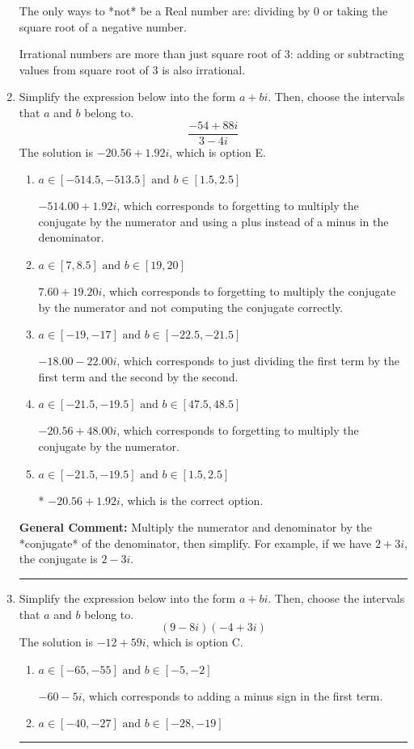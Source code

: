 \documentclass{extbook}[14pt]
\newcommand{\litem}[1]{\item #1

\rule{\textwidth}{0.4pt}}
\begin{document}
\begin{enumerate}
{ The only ways to *not* be a Real number are: dividing by 0 or taking the square root of a negative number. 
 
 Irrational numbers are more than just square root of 3: adding or subtracting values from square root of 3 is also irrational.
}
\litem{
Simplify the expression below into the form $a+bi$. Then, choose the intervals that $a$ and $b$ belong to.
\[ \frac{-54 + 88 i}{3 - 4 i} \]The solution is \( -20.56  + 1.92 i \), which is option E.\begin{enumerate}[label=\Alph*.]
\item \( a \in [-514.5, -513.5] \text{ and } b \in [1.5, 2.5] \)

 $-514.00  + 1.92 i$, which corresponds to forgetting to multiply the conjugate by the numerator and using a plus instead of a minus in the denominator.
\item \( a \in [7, 8.5] \text{ and } b \in [19, 20] \)

 $7.60  + 19.20 i$, which corresponds to forgetting to multiply the conjugate by the numerator and not computing the conjugate correctly.
\item \( a \in [-19, -17] \text{ and } b \in [-22.5, -21.5] \)

 $-18.00  - 22.00 i$, which corresponds to just dividing the first term by the first term and the second by the second.
\item \( a \in [-21.5, -19.5] \text{ and } b \in [47.5, 48.5] \)

 $-20.56  + 48.00 i$, which corresponds to forgetting to multiply the conjugate by the numerator.
\item \( a \in [-21.5, -19.5] \text{ and } b \in [1.5, 2.5] \)

* $-20.56  + 1.92 i$, which is the correct option.
\end{enumerate}

\textbf{General Comment:} Multiply the numerator and denominator by the *conjugate* of the denominator, then simplify. For example, if we have $2+3i$, the conjugate is $2-3i$.
}
\litem{
Simplify the expression below into the form $a+bi$. Then, choose the intervals that $a$ and $b$ belong to.
\[ (9 - 8 i)(-4 + 3 i) \]The solution is \( -12 + 59 i \), which is option C.\begin{enumerate}[label=\Alph*.]
\item \( a \in [-65, -55] \text{ and } b \in [-5, -2] \)

 $-60 - 5 i$, which corresponds to adding a minus sign in the first term.
\item \( a \in [-40, -27] \text{ and } b \in [-28, -19] \)


\end{enumerate}}
\end{enumerate}
\end{document}
